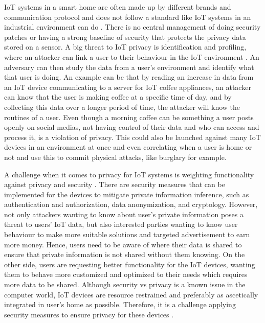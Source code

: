 \gls{IoT} systems in a smart home are often made up by different brands and communication protocol and does not follow a standard like \gls{IoT} systems in an industrial environment can do \cite{IoTPrivSecSmarthome}. There is no central management of doing security patches or having a strong baseline of security that protects the privacy data stored on a sensor. A big threat to \gls{IoT} privacy is identification and profiling, where an attacker can link a user to their behaviour in the \gls{IoT} environment \cite{IoTSecPrivSafeEth}. An adversary can then study the data from a user's environment and identify what that user is doing. An example can be that by reading an increase in data from an \gls{IoT} device communicating to a server for \gls{IoT} coffee appliances, an attacker can know that the user is making coffee at a specific time of day, and by collecting this data over a longer period of time, the attacker will know the routines of a user. Even though a morning coffee can be something a user posts openly on social medias, not having control of their data and who can access and process it, is a violation of privacy. This could also be launched against many \gls{IoT} devices in an environment at once and even correlating when a user is home or not and use this to commit physical attacks, like burglary for example. 

A challenge when it comes to privacy for \gls{IoT} systems is weighting functionality against privacy and security \cite{PrivacyIoTSurvey}. There are security measures that can be implemented for the devices to mitigate private information inference, such as authentication and authorization, data anonymization, and cryptology. However, not only attackers wanting to know about user's private information poses a threat to users' \gls{IoT} data, but also interested parties wanting to know user behaviour to make more suitable solutions and targeted advertisement to earn more money. Hence, users need to be aware of where their data is shared to ensure that private information is not shared without them knowing. On the other side, users are requesting better functionality for the \gls{IoT} devices, wanting them to behave more customized and optimized to their needs which requires more data to be shared. Although security vs privacy is a known issue in the computer world, \gls{IoT} devices are resource restrained and preferably as ascetically integrated in user's home as possible. Therefore, it is a challenge applying security measures to ensure privacy for these devices \cite{PrivacyIoTSurvey}. 


